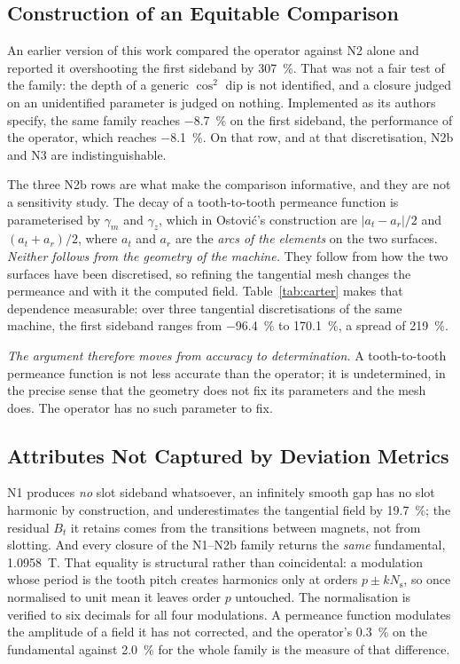 \documentclass[10pt,a4paper,twocolumn]{article}
\theoremstyle{plain}
\theoremstyle{remark}
\begin{document}
\subsection{Construction of an Equitable Comparison}

An earlier version of this work compared the operator against N2 alone
and reported it overshooting the first sideband by \SI{307}{\percent}.
That was not a fair test of the family: the depth of a generic $\cos^2$
dip is not identified, and a closure judged on an unidentified parameter
is judged on nothing. Implemented as its authors specify, the same
family reaches \SI{-8.7}{\percent} on the first sideband, the
performance of the operator, which reaches \SI{-8.1}{\percent}. On that
row, and at that discretisation, N2b and N3 are indistinguishable.

The three N2b rows are what make the comparison informative, and they
are not a sensitivity study. The decay of a tooth-to-tooth permeance
function is parameterised by $\gamma_m$ and $\gamma_z$, which in
Ostovi\'c's construction are $|a_t-a_r|/2$ and $(a_t+a_r)/2$, where
$a_t$ and $a_r$ are the \emph{arcs of the elements} on the two surfaces.
\emph{Neither follows from the geometry of the machine.} They follow
from how the two surfaces have been discretised, so refining the
tangential mesh changes the permeance and with it the computed field.
Table~\ref{tab:carter} makes that dependence measurable: over three
tangential discretisations of the same machine, the first sideband
ranges from \SI{-96.4}{\percent} to \SI{+170.1}{\percent}, a spread of
\SI{219}{\percent}.

\emph{The argument therefore moves from accuracy to determination.} A
tooth-to-tooth permeance function is not less accurate than the
operator; it is undetermined, in the precise sense that the geometry
does not fix its parameters and the mesh does. The operator has no such
parameter to fix.

\subsection{Attributes Not Captured by Deviation Metrics}

N1 produces \emph{no} slot sideband whatsoever, an infinitely smooth
gap has no slot harmonic by construction, and underestimates the
tangential field by \SI{19.7}{\percent}; the residual $B_t$ it retains
comes from the transitions between magnets, not from slotting. And every
closure of the N1--N2b family returns the \emph{same} fundamental,
\SI{1.0958}{\tesla}. That equality is structural rather than
coincidental: a modulation whose period is the tooth pitch creates
harmonics only at orders $p\pm kN_{\mathrm{s}}$, so once normalised to
unit mean it leaves order $p$ untouched. The normalisation is verified
to six decimals for all four modulations. A permeance function modulates
the amplitude of a field it has not corrected, and the operator's
\SI{+0.3}{\percent} on the fundamental against \SI{+2.0}{\percent} for
the whole family is the measure of that difference.
\end{document}
